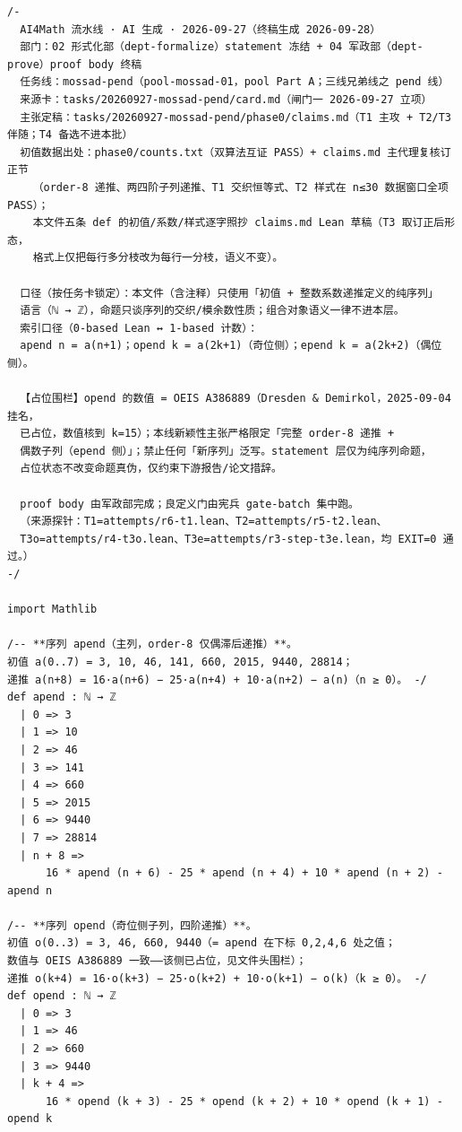 \documentclass[11pt]{article}
\theoremstyle{definition}
\begin{document}
\begin{lstlisting}[basicstyle=\ttfamily\footnotesize,caption={Complete proofs of
Theorems~\ref{thm:t1}--\ref{thm:t3e}, verbatim lines 1--259 (whole file) of
\texttt{final/01-pend-proved.lean} (sha256 \texttt{be3f31cb}); the smaller
monospace width is typesetting only, listing bytes are the frozen file's own.},
label={lst:proof}]
/-
  AI4Math 流水线 · AI 生成 · 2026-09-27（终稿生成 2026-09-28）
  部门：02 形式化部（dept-formalize）statement 冻结 + 04 军政部（dept-prove）proof body 终稿
  任务线：mossad-pend（pool-mossad-01，pool Part A；三线兄弟线之 pend 线）
  来源卡：tasks/20260927-mossad-pend/card.md（闸门一 2026-09-27 立项）
  主张定稿：tasks/20260927-mossad-pend/phase0/claims.md（T1 主攻 + T2/T3 伴随；T4 备选不进本批）
  初值数据出处：phase0/counts.txt（双算法互证 PASS）+ claims.md 主代理复核订正节
    （order-8 递推、两四阶子列递推、T1 交织恒等式、T2 样式在 n≤30 数据窗口全项 PASS）；
    本文件五条 def 的初值/系数/样式逐字照抄 claims.md Lean 草稿（T3 取订正后形态，
    格式上仅把每行多分枝改为每行一分枝，语义不变）。

  口径（按任务卡锁定）：本文件（含注释）只使用「初值 + 整数系数递推定义的纯序列」
  语言（ℕ → ℤ），命题只谈序列的交织/模余数性质；组合对象语义一律不进本层。
  索引口径（0-based Lean ↔ 1-based 计数）：
  apend n = a(n+1)；opend k = a(2k+1)（奇位侧）；epend k = a(2k+2)（偶位侧）。

  【占位围栏】opend 的数值 = OEIS A386889（Dresden & Demirkol，2025-09-04 挂名，
  已占位，数值核到 k=15）；本线新颖性主张严格限定「完整 order-8 递推 +
  偶数子列（epend 侧）」；禁止任何「新序列」泛写。statement 层仅为纯序列命题，
  占位状态不改变命题真伪，仅约束下游报告/论文措辞。

  proof body 由军政部完成；良定义门由宪兵 gate-batch 集中跑。
  （来源探针：T1=attempts/r6-t1.lean、T2=attempts/r5-t2.lean、
  T3o=attempts/r4-t3o.lean、T3e=attempts/r3-step-t3e.lean，均 EXIT=0 通过。）
-/

import Mathlib

/-- **序列 apend（主列，order-8 仅偶滞后递推）**。
初值 a(0..7) = 3, 10, 46, 141, 660, 2015, 9440, 28814；
递推 a(n+8) = 16·a(n+6) − 25·a(n+4) + 10·a(n+2) − a(n)（n ≥ 0）。 -/
def apend : ℕ → ℤ
  | 0 => 3
  | 1 => 10
  | 2 => 46
  | 3 => 141
  | 4 => 660
  | 5 => 2015
  | 6 => 9440
  | 7 => 28814
  | n + 8 =>
      16 * apend (n + 6) - 25 * apend (n + 4) + 10 * apend (n + 2) - apend n

/-- **序列 opend（奇位侧子列，四阶递推）**。
初值 o(0..3) = 3, 46, 660, 9440（= apend 在下标 0,2,4,6 处之值；
数值与 OEIS A386889 一致——该侧已占位，见文件头围栏）；
递推 o(k+4) = 16·o(k+3) − 25·o(k+2) + 10·o(k+1) − o(k)（k ≥ 0）。 -/
def opend : ℕ → ℤ
  | 0 => 3
  | 1 => 46
  | 2 => 660
  | 3 => 9440
  | k + 4 =>
      16 * opend (k + 3) - 25 * opend (k + 2) + 10 * opend (k + 1) - opend k


\end{lstlisting}
\end{document}
